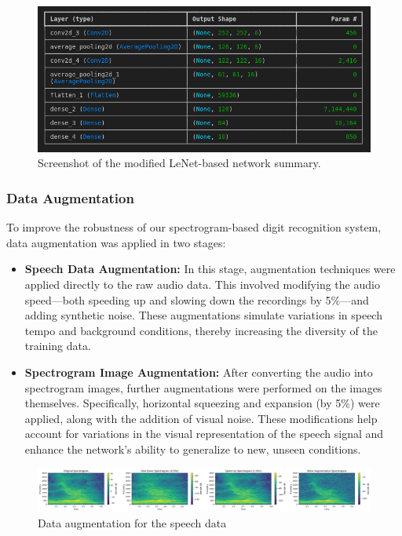 \documentclass[a4paper,12pt]{article}
\begin{document}
\begin{figure}[h]
\centering
\includegraphics[width=\textwidth]{network.png} %
\caption{Screenshot of the modified LeNet-based network summary.}
\label{fig:model_summary}
\end{figure}


\subsubsection{Data Augmentation}
To improve the robustness of our spectrogram-based digit recognition system, data augmentation was applied in two stages:

\begin{itemize}
    \item \textbf{Speech Data Augmentation:} In this stage, augmentation techniques were applied directly to the raw audio data. This involved modifying the audio speed—both speeding up and slowing down the recordings by 5\%—and adding synthetic noise. These augmentations simulate variations in speech tempo and background conditions, thereby increasing the diversity of the training data.
    
    \item \textbf{Spectrogram Image Augmentation:} After converting the audio into spectrogram images, further augmentations were performed on the images themselves. Specifically, horizontal squeezing and expansion (by 5\%) were applied, along with the addition of visual noise. These modifications help account for variations in the visual representation of the speech signal and enhance the network's ability to generalize to new, unseen conditions.
\end{itemize}

\begin{figure}[h]
\centering
\includegraphics[width=\textwidth]{speech_aug.png} %
\caption{Data augmentation for the speech data}
\label{fig:speech_aug}
\end{figure}
\end{document}
